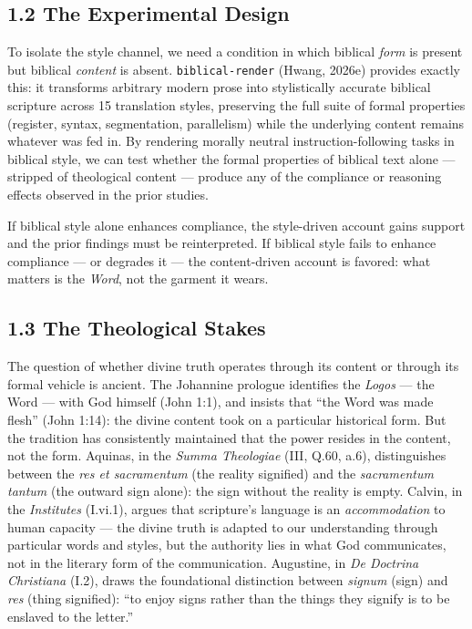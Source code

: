 \documentclass[10pt, letterpaper, twocolumn]{article}
\begin{document}
\subsection*{1.2 The Experimental Design}\label{the-experimental-design}

To isolate the style channel, we need a condition in which biblical \emph{form} is present but biblical \emph{content} is absent. \texttt{biblical-render} (Hwang, 2026e) provides exactly this: it transforms arbitrary modern prose into stylistically accurate biblical scripture across 15 translation styles, preserving the full suite of formal properties (register, syntax, segmentation, parallelism) while the underlying content remains whatever was fed in. By rendering morally neutral instruction-following tasks in biblical style, we can test whether the formal properties of biblical text alone --- stripped of theological content --- produce any of the compliance or reasoning effects observed in the prior studies.

If biblical style alone enhances compliance, the style-driven account gains support and the prior findings must be reinterpreted. If biblical style fails to enhance compliance --- or degrades it --- the content-driven account is favored: what matters is the \emph{Word}, not the garment it wears.

\subsection*{1.3 The Theological Stakes}\label{the-theological-stakes}

The question of whether divine truth operates through its content or through its formal vehicle is ancient. The Johannine prologue identifies the \emph{Logos} --- the Word --- with God himself (John 1:1), and insists that ``the Word was made flesh'' (John 1:14): the divine content took on a particular historical form. But the tradition has consistently maintained that the power resides in the content, not the form. Aquinas, in the \emph{Summa Theologiae} (III, Q.60, a.6), distinguishes between the \emph{res et sacramentum} (the reality signified) and the \emph{sacramentum tantum} (the outward sign alone): the sign without the reality is empty. Calvin, in the \emph{Institutes} (I.vi.1), argues that scripture's language is an \emph{accommodation} to human capacity --- the divine truth is adapted to our understanding through particular words and styles, but the authority lies in what God communicates, not in the literary form of the communication. Augustine, in \emph{De Doctrina Christiana} (I.2), draws the foundational distinction between \emph{signum} (sign) and \emph{res} (thing signified): ``to enjoy signs rather than the things they signify is to be enslaved to the letter.''
\end{document}
